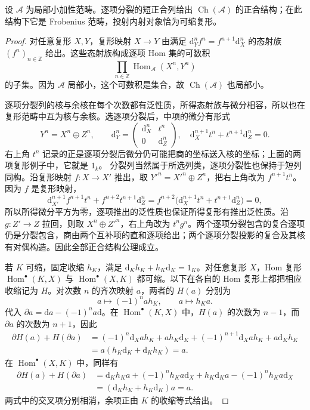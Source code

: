 \begin{proposition}\label{b4:prop:D-complex-frobenius}
	设 \(\mathcal A\) 为局部小加性范畴。逐项分裂的短正合列给出 \(\operatorname{Ch}(\mathcal A)\) 的正合结构；在此结构下它是 Frobenius 范畴，投射内射对象恰为可缩复形。
\end{proposition}
\begin{proof}
	对任意复形 \(X,Y\)，复形映射 \(X\to Y\) 由满足 \(\mathrm{d}_Y^nf^n=f^{n+1}\mathrm{d}_X^n\) 的态射族 \((f^n)_{n\in\mathbb Z}\) 给出。这些态射族构成逐项 Hom 集的可数积
	\[
		\prod_{n\in\mathbb Z}\operatorname{Hom}_{\mathcal A}(X^n,Y^n)
	\]
	的子集。因为 \(\mathcal A\) 局部小，这个可数积是集合，故 \(\operatorname{Ch}(\mathcal A)\) 也局部小。

	逐项分裂列的核与余核在每个次数都有泛性质，所得态射族与微分相容，所以也在复形范畴中互为核与余核。选逐项分裂后，中项的微分有形式
	\[
		Y^n=X^n\oplus Z^n, \qquad \mathrm{d}_Y^n=
		\begin{pmatrix}\mathrm{d}_X^n&t^n\\0&\mathrm{d}_Z^n\end{pmatrix},
		\quad \mathrm{d}_X^{n+1}t^n+t^{n+1}\mathrm{d}_Z^n=0.
	\]
	右上角 \(t^n\) 记录的正是逐项分裂后微分仍可能把商的坐标送入核的坐标；上面的两项复形例子中，它就是 \(1_k\)。 分裂列当然属于所选列类，逐项分裂性也保持于短列同构。沿复形映射 \(f:X\to X'\) 推出，取 \(Y'^n=X'^n\oplus Z^n\)，把右上角改为 \(f^{n+1}t^n\)。因为 \(f\) 是复形映射，
	\[
		\mathrm d_{X'}^{n+1}f^{n+1}t^n+f^{n+2}t^{n+1}\mathrm d_Z^n =f^{n+2}\bigl(\mathrm d_X^{n+1}t^n+t^{n+1}\mathrm d_Z^n\bigr)=0,
	\]
	所以所得微分平方为零，逐项推出的泛性质也保证所得复形有推出泛性质。沿 \(g:Z'\to Z\) 拉回，则取 \(X^n\oplus Z'^n\)，右上角改为 \(t^ng^n\)。两个逐项分裂包含的复合逐项仍是分裂包含，商由两个互补项的直和逐项给出；两个逐项分裂投影的复合及其核有对偶构造。因此全部正合结构公理成立。

	若 \(K\) 可缩，固定收缩 \(h_K\)，满足 \(\mathrm{d}_Kh_K+h_K\mathrm{d}_K=1_K\)。对任意复形 \(X\)，Hom 复形 \(\operatorname{Hom}^\bullet(K,X)\) 与 \(\operatorname{Hom}^\bullet(X,K)\) 都可缩。以下在各自的 Hom 复形上都把相应收缩记为 \(H\)。对次数 \(n\) 的齐次映射 \(a\)，两者的 \(H(a)\) 分别为
	\[
		a\longmapsto(-1)^n a h_K, \qquad a\longmapsto h_Ka.
	\]
	代入 \(\partial a=\mathrm{d}a-(-1)^na\mathrm{d}\)。在 \(\operatorname{Hom}^\bullet(K,X)\) 中，\(H(a)\) 的次数为 \(n-1\)，而 \(\partial a\) 的次数为 \(n+1\)，因此
	\[
		\begin{aligned}
			\partial H(a)+H(\partial a) &=(-1)^n\mathrm d_Xa h_K+a h_K\mathrm d_K +(-1)^{n+1}\mathrm d_Xa h_K+a\mathrm d_Kh_K\\
			&=a(h_K\mathrm d_K+\mathrm d_Kh_K)=a.
		\end{aligned}
	\]
	在 \(\operatorname{Hom}^\bullet(X,K)\) 中，同样有
	\[
		\begin{aligned}
			\partial H(a)+H(\partial a) &=\mathrm d_Kh_Ka+(-1)^nh_Ka\mathrm d_X +h_K\mathrm d_Ka-(-1)^nh_Ka\mathrm d_X\\
			&=(\mathrm d_Kh_K+h_K\mathrm d_K)a=a.
		\end{aligned}
	\]
	两式中的交叉项分别相消，余项正由 \(K\) 的收缩等式给出。


\end{proof}
